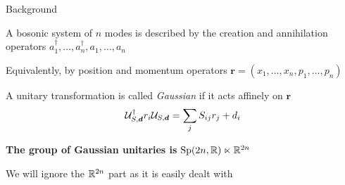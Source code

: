 
\begin{frame}{Background}

  \begin{spaceditemize}
    \item A bosonic system of \(n\) modes is described by the creation and annihilation operators \(a_1^\dag,\dots,a_n^\dag, a_1, \dots, a_n\)
    \item Equivalently, by position and momentum operators \(\bm r = (x_1, \dots, x_n, p_1, \dots, p_n)\)
    \pause
    \item A unitary transformation is called \textit{Gaussian} if it acts affinely on \(\bm r\)
    \[\mathcal{U}_{S, \bm d}^\dag r_i \mathcal{U}_{S, \bm d} = \sum_{j} S_{ij}r_j + d_i \]
    \item \textbf{The group of Gaussian unitaries is} \(\mathrm{Sp}(2n, \mathbb{R})  \ltimes \mathbb{R}^{2n}\)
    \pause
    \item We will ignore the \(\mathbb{R}^{2n}\) part as it is easily dealt with
  \end{spaceditemize}

\end{frame}




